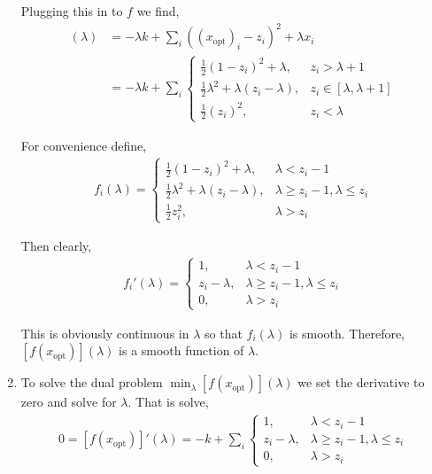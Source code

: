 \documentclass[10pt]{article}
\begin{document}
\begin{solution}[Solution]
\begin{enumerate}[label=(\alph*)]
        Plugging this in to \( f \) we find,
        \begin{align*}
            [f(x_{\text{opt}})](\lambda) &= 
            -\lambda k + \sum_{i}^{} ((x_{\text{opt}})_i - z_i)^2 + \lambda x_i
            \\&=
            -\lambda k + \sum_{i}^{}
            \begin{cases}
                \frac{1}{2}(1-z_i)^2 + \lambda, & z_i > \lambda+1 \\
                \frac{1}{2} \lambda^2 + \lambda (z_i-\lambda) , & z_i \in [\lambda,\lambda+1] \\
                \frac{1}{2}(z_i)^2 , & z_i < \lambda
            \end{cases}
        \end{align*}
        
        For convenience define,
        \begin{align*}
            f_i(\lambda) = 
             \begin{cases}
                \frac{1}{2}(1-z_i)^2 + \lambda, & \lambda < z_i-1 \\
                 \frac{1}{2} \lambda^2 + \lambda (z_i-\lambda) , & \lambda \geq z_i-1, \lambda\leq z_i \\
                \frac{1}{2} z_i^2 , & \lambda > z_i
            \end{cases}
        \end{align*}
        
        Then clearly,
        \begin{align*}
            f_i'(\lambda) = 
             \begin{cases}
                1, & \lambda < z_i-1 \\
                z_i - \lambda, & \lambda \geq z_i-1, \lambda\leq z_i \\
                0 , & \lambda > z_i
            \end{cases}
        \end{align*}

        This is obviously continuous in \( \lambda \) so that \( f_i(\lambda) \) is smooth. Therefore, \( [f(x_\text{opt})](\lambda) \) is a smooth function of \( \lambda \).
        

    \item 
        To solve the dual problem \( \min_{\lambda} [f(x_{\text{opt}})](\lambda) \) we set the derivative to zero and solve for \( \lambda \). That is solve,
        \begin{align*}
            0 = [f(x_{\text{opt}})]'(\lambda)
            = -k + \sum_{i}^{} \begin{cases}
                1, & \lambda < z_i-1 \\
                z_i-\lambda, & \lambda \geq z_i-1, \lambda\leq z_i \\
                0, & \lambda > z_i
            \end{cases}
        \end{align*}


\end{enumerate}
\end{solution}
\end{document}
